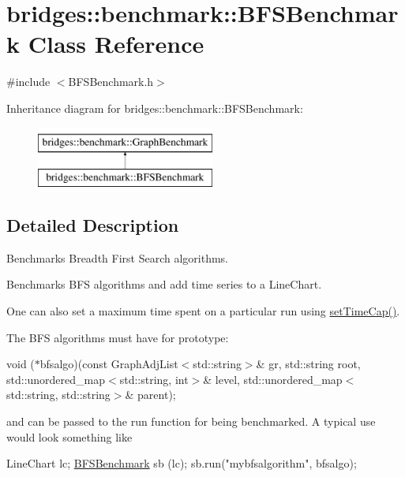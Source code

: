 \hypertarget{classbridges_1_1benchmark_1_1_b_f_s_benchmark}{}\section{bridges\+:\+:benchmark\+:\+:B\+F\+S\+Benchmark Class Reference}
\label{classbridges_1_1benchmark_1_1_b_f_s_benchmark}


{\ttfamily \#include $<$B\+F\+S\+Benchmark.\+h$>$}

Inheritance diagram for bridges\+:\+:benchmark\+:\+:B\+F\+S\+Benchmark\+:\begin{figure}[H]
\begin{center}
\leavevmode
\includegraphics[height=2.000000cm]{classbridges_1_1benchmark_1_1_b_f_s_benchmark}
\end{center}
\end{figure}


\subsection{Detailed Description}
Benchmarks Breadth First Search algorithms. 

Benchmarks B\+FS algorithms and add time series to a Line\+Chart.

One can also set a maximum time spent on a particular run using \hyperlink{classbridges_1_1benchmark_1_1_graph_benchmark_a56934eb2789e54c088e7b4423c3a7456}{set\+Time\+Cap()}.

The B\+FS algorithms must have for prototype\+:

void ($\ast$bfsalgo)(const Graph\+Adj\+List$<$std\+::string$>$\& gr, std\+::string root, std\+::unordered\+\_\+map$<$std\+::string, int$>$\& level, std\+::unordered\+\_\+map$<$std\+::string, std\+::string$>$\& parent);

and can be passed to the run function for being benchmarked. A typical use would look something like


\begin{DoxyCode}
LineChart lc;
\hyperlink{classbridges_1_1benchmark_1_1_b_f_s_benchmark_abd3525c2c0512a397c29ca41ae6982df}{BFSBenchmark} sb (lc);
sb.run(\textcolor{stringliteral}{"mybfsalgorithm"}, bfsalgo);
\end{DoxyCode}


